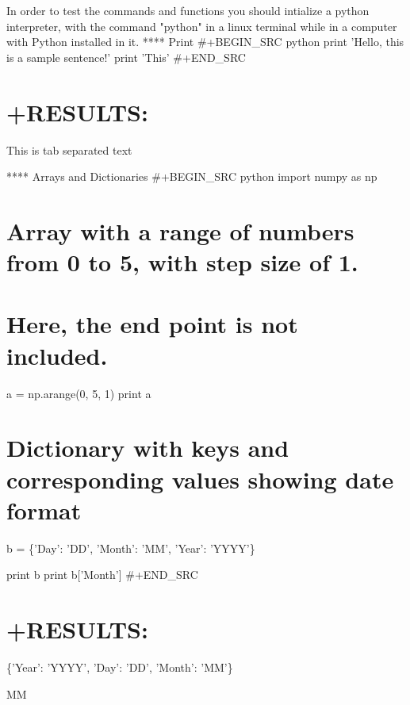 \documentclass[11pt]{article}
\providecommand{\tightlist}{%
      \setlength{\itemsep}{0pt}\setlength{\parskip}{0pt}}
\begin{document}
In order to test the commands and functions you should intialize a
python interpreter, with the command "python" in a linux terminal while
in a computer with Python installed in it. **** Print \#+BEGIN\_SRC
python print 'Hello, this is a sample sentence!' print
'This\tis\ttab\tseparated\ttext' \#+END\_SRC

\section{+RESULTS:}\label{results-6}

\begin{description}
\tightlist
\item[: Hello, this is a sample sentence!]
This is tab separated text
\end{description}

**** Arrays and Dictionaries \#+BEGIN\_SRC python import numpy as np

\section{Array with a range of numbers from 0 to 5, with step size of
1.}\label{array-with-a-range-of-numbers-from-0-to-5-with-step-size-of-1.}

\section{Here, the end point is not
included.}\label{here-the-end-point-is-not-included.}

a = np.arange(0, 5, 1) print a

\section{Dictionary with keys and corresponding values showing date
format}\label{dictionary-with-keys-and-corresponding-values-showing-date-format}

b = \{'Day': 'DD', 'Month': 'MM', 'Year': 'YYYY'\}

print b print b{[}'Month'{]} \#+END\_SRC

\section{+RESULTS:}\label{results-7}

\begin{description}
\tightlist
\item[: {[}0 1 2 3 4{]}]
\{'Year': 'YYYY', 'Day': 'DD', 'Month': 'MM'\}

MM
\end{description}
\end{document}
